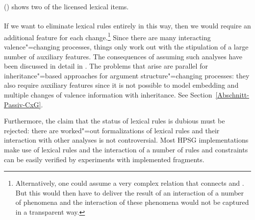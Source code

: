 () shows two of the licensed lexical items.
\eal
\ex {}\\
\ex {}\\
\zl
If we want to eliminate lexical rules entirely in this way, then we would require an additional feature for each change.\footnote{
Alternatively, one could assume a very complex relation that connects \argst and \subcat. But this would then have to deliver
the result of an interaction of a number of phenomena and the interaction of these phenomena would not be captured in a transparent way.%
} Since there are many interacting valence"=changing processes, things only work out with the stipulation of a large number of auxiliary
features. The consequences of assuming such analyses have been discussed in detail in
. The problems that arise are parallel for
inheritance"=based approaches for argument structure"=changing processes: they also require
auxiliary features since it is not possible to model embedding and multiple changes of valence information with inheritance. See Section~\ref{Abschnitt-Passiv-CxG}.

Furthermore, the claim that the status of lexical rules is dubious must be rejected: there are worked"=out formalizations of lexical rules \citep{Meurers2001a,CB92a,LC99a}
and their interaction with other analyses is not controversial. Most HPSG implementations make use of lexical rules and the interaction of a number of rules and
constraints can be easily verified by experiments with implemented fragments.


